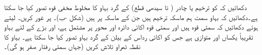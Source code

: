 \quad
دکھائیں کہ  کو ترخیم یا چادر ( تا  سیدھی قطع) کے گرد بہاو کا مخلوط مخفی قوہ تصور کیا جا سکتا ہے۔دکھائیں کہ بہاو سمت ہم ماسکہ ترخیم ہیں جن کے ماسکہ  پر ہیں (شکل -ب)۔
\quad {}\quad
{} پر غور کریں۔  لیتے ہوئے دکھائیں کہ سمتی قوہ  ہیں اور سمتی قوہ  اکائی دائرہ اور  محور پر مشتمل ہے، اور بڑے  کے لئے بہاو تقریباً یکساں اور متوازی ہے جس کو اکائی رداس کے بیلن کے گرد بہاو تصور کیا جا سکتا ہے۔ بہاو کا نقطہ ٹھراو تلاش کریں (جہاں سمتی رفتار صفر ہو گی)۔

